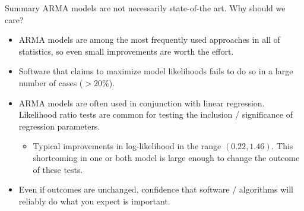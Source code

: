 \documentclass[aspectratio=169]{beamer}\usepackage[]{graphicx}\usepackage[]{xcolor}
\begin{document}
\begin{frame}{Summary}
$\mathrm{ARMA}$ models are not necessarily state-of-the art. Why should we care?
  \begin{itemize}
    \item $\mathrm{ARMA}$ models are among the most frequently used approaches in all of statistics, so even small improvements are worth the effort.\pause
    \item Software that claims to maximize model likelihoods fails to do so in a large number of cases ($>20\%$).\pause
    \item $\mathrm{ARMA}$ models are often used in conjunction with linear regression. Likelihood ratio tests are common for testing the inclusion / significance of regression parameters.\pause
    \begin{itemize}
      \item Typical improvements in log-likelihood in the range $(0.22, 1.46)$. This shortcoming in one or both model is large enough to change the outcome of these tests.\pause
    \end{itemize}
    \item Even if outcomes are unchanged, confidence that software / algorithms will reliably do what you expect is important. 
  \end{itemize}
\end{frame}
\end{document}
